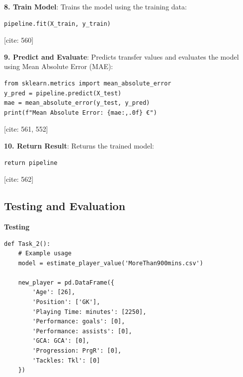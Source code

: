 \documentclass[12pt]{report}
\begin{document}
{{{\textbf{8. Train Model}:
Trains the model using the training data:
\begin{verbatim}
pipeline.fit(X_train, y_train)
\end{verbatim} [cite: 560]

\textbf{9. Predict and Evaluate}:
Predicts transfer values and evaluates the model using Mean Absolute Error (MAE):
\begin{verbatim}
from sklearn.metrics import mean_absolute_error
y_pred = pipeline.predict(X_test)
mae = mean_absolute_error(y_test, y_pred)
print(f"Mean Absolute Error: {mae:,.0f} €")
\end{verbatim} [cite: 561, 552]

\textbf{10. Return Result}:
Returns the trained model:
\begin{verbatim}
return pipeline
\end{verbatim} [cite: 562]

\subsection{Testing and Evaluation}
\textbf{Testing}\\
\begin{lstlisting}
def Task_2():
    # Example usage
    model = estimate_player_value('MoreThan900mins.csv')

    new_player = pd.DataFrame({
        'Age': [26],
        'Position': ['GK'],
        'Playing Time: minutes': [2250],
        'Performance: goals': [0],
        'Performance: assists': [0],
        'GCA: GCA': [0],
        'Progression: PrgR': [0],
        'Tackles: Tkl': [0]
    })


\end{lstlisting}}}}
\end{document}
